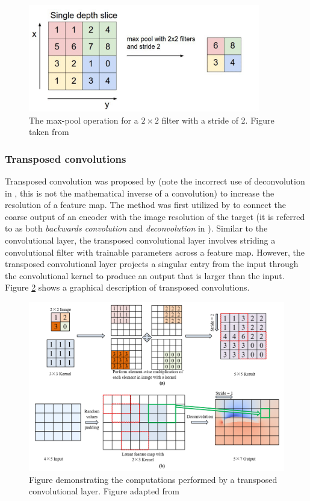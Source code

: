 \documentclass[../main/thesis.tex]{subfiles}
\begin{document}
\begin{figure}
    \centering
    \includegraphics[width=0.9\textwidth]{The-MaxPool-operation}
    \caption{\label{fig:maxpool}The max-pool operation for a $2 \times 2$ filter with a stride of 2. Figure taken from \protect\citet{MihaiDaniel2020}}
\end{figure}

\subsubsection{Transposed convolutions}
\label{sec:tconv}
Transposed convolution was proposed by \citet{Zeiler2010} (note the incorrect use of deconvolution in \citet{Zeiler2010}, this is not the mathematical inverse of a convolution) to increase the resolution of a feature map. The method was first utilized by \citet{Long2015} to connect the coarse output of an encoder with the image resolution of the target (it is referred to as both \textit{backwards convolution} and \textit{deconvolution} in \citet{Long2015}). Similar to the convolutional layer, the transposed convolutional layer involves striding a convolutional filter with trainable parameters across a feature map. However, the transposed convolutional layer projects a singular entry from the input through the convolutional kernel to produce an output that is larger than the input. Figure \ref{fig:tconv} shows a graphical description of transposed convolutions.

\begin{figure}
    \centering
    \includegraphics[trim = {0 5.125cm 0 0}, clip, width = \textwidth]{applsci-12-12075-g004}
    \caption{\label{fig:tconv}Figure demonstrating the computations performed by a transposed convolutional layer. Figure adapted from \protect\citet{Wu2022}}
\end{figure}
\end{document}
